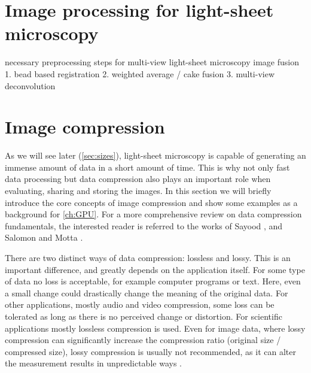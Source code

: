 


  \graphicspath{{./figures/3_processing/}}

  \section{Image processing for light-sheet microscopy}
  
    necessary preprocessing steps for multi-view light-sheet microscopy
    image fusion
      1. bead based registration
      2. weighted average / cake fusion
      3. multi-view deconvolution
  
  \section{Image compression}
    As we will see later (\autoref{sec:sizes}), light-sheet microscopy is capable of generating an immense amount of data in a short amount of time. This is why not only fast data processing but data compression also plays an important role when evaluating, sharing and storing the images. In this section we will briefly introduce the core concepts of image compression and show some examples as a background for \autoref{ch:GPU}. For a more comprehensive review on data compression fundamentals, the interested reader is referred to the works of Sayood \cite{sayood_introduction_2012}, and Salomon and Motta \cite{salomon_handbook_2010}.
   
    There are two distinct ways of data compression: lossless and lossy. This is an important difference, and greatly depends on the application itself. For some type of data no loss is acceptable, for example computer programs or text. Here, even a small change could drastically change the meaning of the original data. For other applications, mostly audio and video compression, some loss can be tolerated as long as there is no perceived change or distortion. For scientific applications mostly lossless compression is used. Even for image data, where lossy compression can significantly increase the compression ratio (original size / compressed size), lossy compression is usually not recommended, as it can alter the measurement results in unpredictable ways \cite{cromey_digital_2013}.
  
